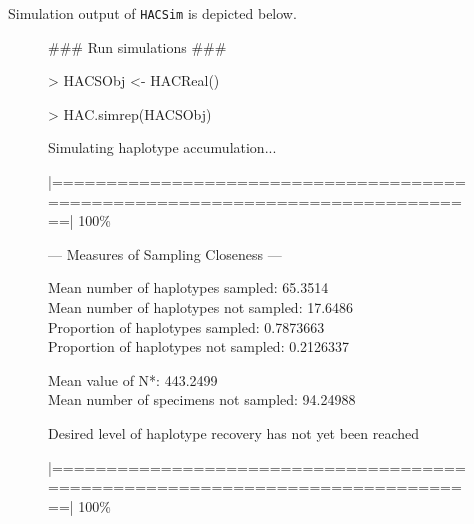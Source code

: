 \noindent Simulation output of {\tt HACSim} is depicted below.

\vspace{3mm}

\begin{figure}[H]

{\scriptsize \tt

{\noindent \#\#\# Run simulations \#\#\#}

\vspace{1mm}

{\noindent > HACSObj <- HACReal()}

\vspace{1mm}

{\noindent > HAC.simrep(HACSObj)} 

\vspace{1mm}

\noindent Simulating haplotype accumulation...

\vspace{2mm}
 
\noindent |==============================================================================| 100\%
  
\vspace{3mm}
 
\noindent --- Measures of Sampling Closeness ---

\vspace{2mm} 
 
\noindent Mean number of haplotypes sampled: 65.3514  \\
Mean number of haplotypes not sampled: 17.6486   \\
Proportion of haplotypes sampled: 0.7873663 \\
Proportion of haplotypes not sampled: 0.2126337   

\vspace{2mm} 
 
\noindent Mean value of N*: 443.2499  \\
Mean number of specimens not sampled: 94.24988

\vspace{3mm}
 
\noindent Desired level of haplotype recovery has not yet been reached 

\vspace{2mm}

\noindent |==============================================================================| 100\%

\vspace{3mm}

}
\end{figure}
